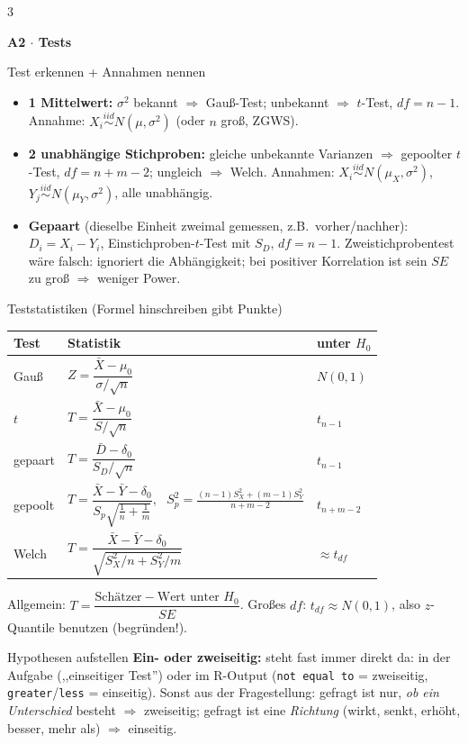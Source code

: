 \documentclass[8pt,a4paper,landscape]{extarticle}
\renewcommand{\arraystretch}{1.12}
\newcommand{\sect}[1]{\par\vspace{1pt}%
  {\fontsize{10}{11}\selectfont\bfseries #1}\par\nobreak\vspace{1pt}\nobreak}
\newcommand{\iid}{\overset{iid}{\sim}}
\newcommand{\ra}{$\Rightarrow$}
\begin{document}
\begin{multicols*}{3}
\sect{A2 $\cdot$ Tests}
\begin{wissen}{Test erkennen + Annahmen nennen}
\begin{itemize}
\item \textbf{1 Mittelwert:} $\sigma^2$ bekannt \ra{} Gauß-Test; unbekannt \ra{} $t$-Test, $df=n-1$. Annahme: $X_i\iid N(\mu,\sigma^2)$ (oder $n$ groß, ZGWS).
\item \textbf{2 unabhängige Stichproben:} gleiche unbekannte Varianzen \ra{} gepoolter $t$-Test, $df=n+m-2$; ungleich \ra{} Welch. Annahmen: $X_i\iid N(\mu_X,\sigma^2)$, $Y_j\iid N(\mu_Y,\sigma^2)$, alle unabhängig.
\item \textbf{Gepaart} (dieselbe Einheit zweimal gemessen, z.B.\ vorher/nachher): $D_i=X_i-Y_i$, Einstichproben-$t$-Test mit $S_D$, $df=n-1$. Zweistichprobentest wäre falsch: ignoriert die Abhängigkeit; bei positiver Korrelation ist sein $SE$ zu groß \ra{} weniger Power.
\end{itemize}
\end{wissen}
\begin{rechnen}{Teststatistiken (Formel hinschreiben gibt Punkte)}
{\renewcommand{\arraystretch}{1.5}\begin{tabularx}{\linewidth}{@{}>{\raggedright\arraybackslash}p{1.25cm}>{\raggedright\arraybackslash}X>{\raggedright\arraybackslash}p{1.35cm}@{}}
\toprule
Test & Statistik & unter $H_0$ \\
\midrule
Gauß & $Z=\dfrac{\bar X-\mu_0}{\sigma/\sqrt n}$ & $N(0,1)$ \\
$t$ & $T=\dfrac{\bar X-\mu_0}{S/\sqrt n}$ & $t_{n-1}$ \\
gepaart & $T=\dfrac{\bar D-\delta_0}{S_D/\sqrt n}$ & $t_{n-1}$ \\
gepoolt & $T=\dfrac{\bar X-\bar Y-\delta_0}{S_p\sqrt{\frac1n+\frac1m}}$, \ $S_p^2=\frac{(n-1)S_X^2+(m-1)S_Y^2}{n+m-2}$ & $t_{n+m-2}$ \\
Welch & $T=\dfrac{\bar X-\bar Y-\delta_0}{\sqrt{S_X^2/n+S_Y^2/m}}$ & $\approx t_{df}$ \\
\bottomrule
\end{tabularx}}
Allgemein: $T=\dfrac{\text{Schätzer}-\text{Wert unter }H_0}{SE}$. Großes $df$: $t_{df}\approx N(0,1)$, also $z$-Quantile benutzen (begründen!).
\end{rechnen}
\begin{wissen}{Hypothesen aufstellen}
\textbf{Ein- oder zweiseitig:} steht fast immer direkt da: in der Aufgabe (,,einseitiger Test'') oder im R-Output (\texttt{not equal to} = zweiseitig, \texttt{greater}/\texttt{less} = einseitig). Sonst aus der Fragestellung: gefragt ist nur, \emph{ob ein Unterschied} besteht \ra{} zweiseitig; gefragt ist eine \emph{Richtung} (wirkt, senkt, erhöht, besser, mehr als) \ra{} einseitig.

\end{wissen}
\end{multicols*}
\end{document}
